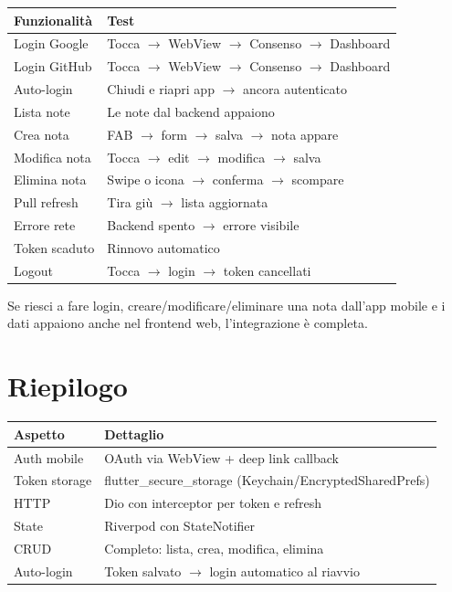 \begin{center}
\begin{tabularx}{\textwidth}{l X}
\toprule
\textbf{Funzionalità} & \textbf{Test} \\
\midrule
Login Google & Tocca $\rightarrow$ WebView $\rightarrow$ Consenso $\rightarrow$ Dashboard \\
Login GitHub & Tocca $\rightarrow$ WebView $\rightarrow$ Consenso $\rightarrow$ Dashboard \\
Auto-login & Chiudi e riapri app $\rightarrow$ ancora autenticato \\
Lista note & Le note dal backend appaiono \\
Crea nota & FAB $\rightarrow$ form $\rightarrow$ salva $\rightarrow$ nota appare \\
Modifica nota & Tocca $\rightarrow$ edit $\rightarrow$ modifica $\rightarrow$ salva \\
Elimina nota & Swipe o icona $\rightarrow$ conferma $\rightarrow$ scompare \\
Pull refresh & Tira giù $\rightarrow$ lista aggiornata \\
Errore rete & Backend spento $\rightarrow$ errore visibile \\
Token scaduto & Rinnovo automatico \\
Logout & Tocca $\rightarrow$ login $\rightarrow$ token cancellati \\
\bottomrule
\end{tabularx}
\end{center}

\begin{checkpointbox}
Se riesci a fare login, creare/modificare/eliminare una nota dall'app mobile e i dati appaiono anche nel frontend web, l'integrazione è completa.
\end{checkpointbox}

\section*{Riepilogo}

\begin{center}
\begin{tabularx}{\textwidth}{l X}
\toprule
\textbf{Aspetto} & \textbf{Dettaglio} \\
\midrule
Auth mobile & OAuth via WebView + deep link callback \\
Token storage & flutter\_secure\_storage (Keychain/EncryptedSharedPrefs) \\
HTTP & Dio con interceptor per token e refresh \\
State & Riverpod con StateNotifier \\
CRUD & Completo: lista, crea, modifica, elimina \\
Auto-login & Token salvato $\rightarrow$ login automatico al riavvio \\
\bottomrule
\end{tabularx}
\end{center}
